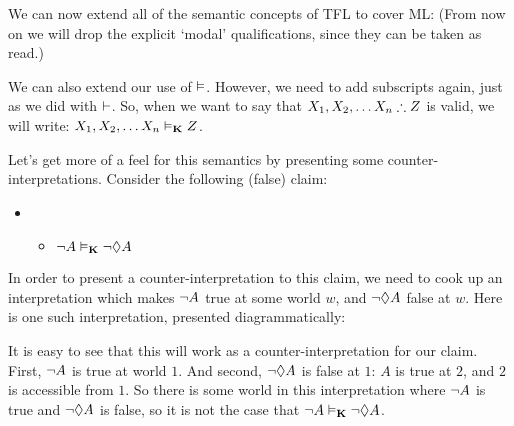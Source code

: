 We can now extend all of the semantic concepts of TFL to cover ML:
(From now on we will drop the explicit `modal' qualifications, since they can be taken as read.)

We can also extend our use of $\vDash$. However, we need to add subscripts again, just as we did with $\vdash$. So, when we want to say that $\metaX_1,\metaX_2, \dots \metaX_n\therefore\metaZ$ is valid, we will write: $X_1,X_2, \dots X_n\vDash_{\mathbf{K}}Z$.

Let's get more of a feel for this semantics by presenting some counter-interpretations. Consider the following (false) claim:
\begin{itemize}
	\item[]
	      \begin{itemize}
		      \item[]$\neg A\vDash_{\mathbf{K}} \neg \Diamond A$
	      \end{itemize}
\end{itemize}
In order to present a counter-interpretation to this claim, we need to cook up an interpretation which makes $\neg A$ true at some world $w$, and $\neg\Diamond A$ false at $w$. Here is one such interpretation, presented diagrammatically:
\begin{center}
\end{center}
It is easy to see that this will work as a counter-interpretation for our claim. First, $\neg A$ is true at world $1$. And second, $\neg\Diamond A$ is false at $1$: $A$ is true at $2$, and $2$ is accessible from $1$. So there is some world in this interpretation where $\neg A$ is true and $\neg\Diamond A$ is false, so it is not the case that $\neg A\vDash_{\mathbf{K}}\neg\Diamond A$.

